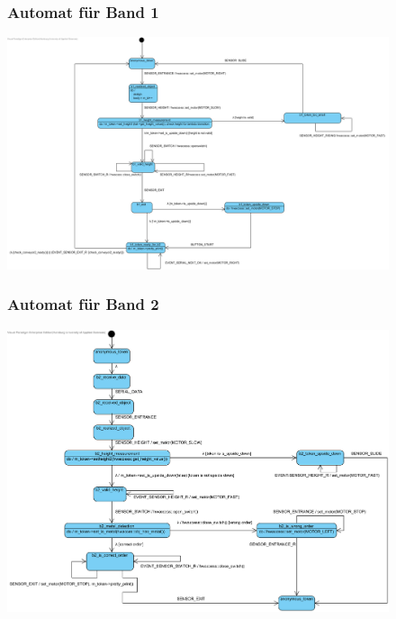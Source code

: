\documentclass[oneside,a4paper,titlepage]{scrartcl} %
\begin{document}
\begin{figure}
	\subsubsection{Automat für Band 1}
	\centering\vfill\includegraphics[angle=90,scale=0.6]{imgs/Band1_FSM.png}
\end{figure}

\begin{figure}
	\subsubsection{Automat für Band 2}
	\centering\vfill\includegraphics[angle=0,scale=0.6]{imgs/Band2_FSM.png}
\end{figure}

\newpage
\end{document}
